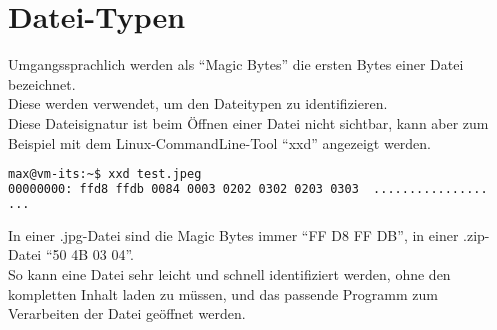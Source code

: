 \section{Datei-Typen}\label{sec:datei-typen}

Umgangssprachlich werden als "`Magic Bytes"' die ersten Bytes einer Datei bezeichnet.\\
Diese werden verwendet, um den Dateitypen zu identifizieren.\\

Diese Dateisignatur ist beim Öffnen einer Datei nicht sichtbar, kann aber zum Beispiel mit dem Linux-CommandLine-Tool "`xxd"' angezeigt werden.

\begin{lstlisting}[language=Bash, caption=Magic Bytes XXD,label={lst:lstlisting}]
max@vm-its:~$ xxd test.jpeg
00000000: ffd8 ffdb 0084 0003 0202 0302 0203 0303  ................
...
\end{lstlisting}
\vspace{5mm}

In einer .jpg-Datei sind die Magic Bytes immer "`FF D8 FF DB"', in einer .zip-Datei "`50 4B 03 04"'.\\
So kann eine Datei sehr leicht und schnell identifiziert werden, ohne den kompletten Inhalt laden zu müssen, und das passende Programm zum Verarbeiten der Datei geöffnet werden.